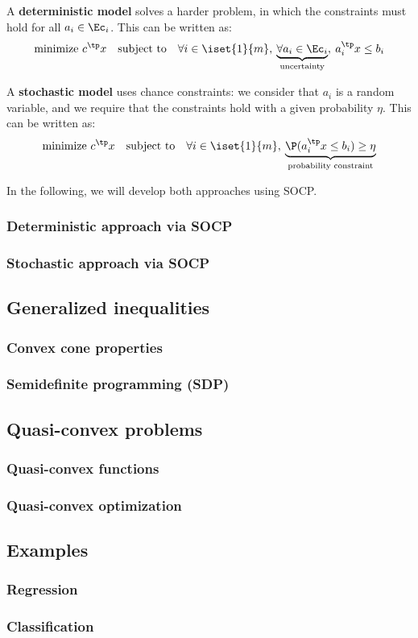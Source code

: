 A \textbf{deterministic model} solves a harder problem, in which the constraints must hold for all $a_i\in\Ec_i$. This can be written as:
\begin{equation*}
    \text{minimize } c^\tp x \quad\text{subject to}\quad \forall i\in\iset{1}{m}, \: \underbrace{\forall a_i\in\Ec_i}_{\text{uncertainty}}, \: a_i^\tp x\leq b_i
\end{equation*}

A \textbf{stochastic model} uses chance constraints: we consider that $a_i$ is a random variable, and we require that the constraints hold with a given probability $\eta$. This can be written as:
\begin{equation*}
    \text{minimize } c^\tp x \quad\text{subject to}\quad \forall i\in\iset{1}{m}, \: \underbrace{\P(a_i^\tp x\leq b_i)\geq\eta}_{\text{probability constraint}}
\end{equation*}

In the following, we will develop both approaches using SOCP.

\subsubsection{Deterministic approach via SOCP}
\subsubsection{Stochastic approach via SOCP}

\subsection{Generalized inequalities}
\subsubsection{Convex cone properties}
\subsubsection{Semidefinite programming (SDP)}

\subsection{Quasi-convex problems}
\subsubsection{Quasi-convex functions}
\subsubsection{Quasi-convex optimization}
\subsection{Examples}
\subsubsection{Regression}
\subsubsection{Classification}